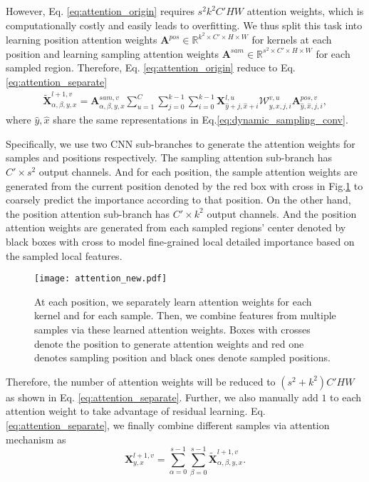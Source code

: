 \documentclass[runningheads]{llncs}
\begin{document}
However, Eq. \ref{eq:attention_origin} requires $s^2k^2C'HW$ attention weights, which is computationally costly and easily leads to overfitting. We thus split this task into learning position attention weights $\textbf{A}^{pos} \in \mathbb{R}^{k^2 \times C'\times H\times W}$ for kernels at each position and learning sampling attention weights $\textbf{A}^{sam} \in \mathbb{R}^{s^2\times C'\times H\times W}$ for each sampled region. Therefore, Eq. \ref{eq:attention_origin} reduce to Eq. \ref{eq:attention_separate}
\begin{align}
 \widetilde{\textbf{X}}_{\alpha,\beta,y,x}^{l+1,v} = \textbf{A}^{sam,v}_{\alpha,\beta,y,x}\sum\limits_{u = 1}^{C}\sum\limits_{j = 0}^{k-1}\sum\limits_{i = 0}^{k-1} \textbf{X}_{\hat{y}+j,\hat{x}+i}^{l,u}\mathcal{W}^{v,u}_{y,x,j,i}\textbf{A}^{pos, v}_{\hat{y},\hat{x},j,i}
 ,
\label{eq:attention_separate}
\end{align}
where $\hat{y},\hat{x}$ share the same representations in Eq.\ref{eq:dynamic_sampling_conv}.

Specifically, we use two CNN sub-branches to generate the attention weights for samples and positions respectively. The sampling attention sub-branch has $C' \times s^2 $ output channels. And for each position, the sample attention weights are generated from the current position denoted by the red box with cross in Fig.\ref{fig:attention} to coarsely predict the importance according to that position. On the other hand, the position attention sub-branch has $C' \times k^2 $ output channels. And the position attention weights are generated from each sampled regions' center denoted by black boxes with cross to model fine-grained local detailed importance based on the sampled local features. 

\begin{figure}[t]
\centering
\texttt{[image: attention\_new.pdf]}
\caption{At each position, we separately learn attention weights for each kernel and for each sample. Then, we combine features from multiple samples via these learned attention weights. Boxes with crosses denote the position to generate attention weights and red one denotes sampling position and black ones denote sampled positions.}
\label{fig:attention}
\end{figure}

Therefore, the number of attention weights will be reduced to $(s^2+k^2)C'HW$ as shown in Eq. \ref{eq:attention_separate}. Further, we also manually add $1$ to each attention weight to take advantage of residual learning. \Obtaining Eq. \ref{eq:attention_separate}, we finally combine different samples via attention mechanism as 
\begin{equation}
    \textbf{X}_{y,x}^{l+1,v} = \sum\limits_{\alpha = 0}^{s-1}\sum\limits_{\beta = 0}^{s-1} \widetilde{\textbf{X}}_{\alpha,\beta,y,x}^{l+1,v}
    .
    \label{eq:attention_combine}
\end{equation}
\end{document}
